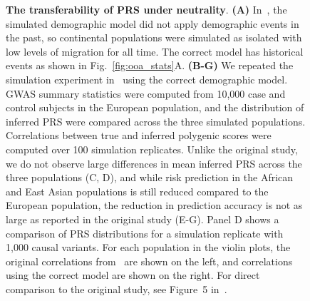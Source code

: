\documentclass{article}
\begin{document}
\begin{figure}[ht]
\begin{center}
\caption{\textbf{The transferability of PRS under neutrality}.
    \textbf{(A)} In~\citet{martin2017human}, the simulated demographic model did not apply demographic
    events in the past, so continental populations were simulated as isolated with low levels of migration
    for all time. The correct model has historical events as shown in Fig.~\ref{fig:ooa_stats}A.
    \textbf{(B-G)} We repeated the simulation experiment in~\citet{martin2017human} using the correct
    demographic model.
    GWAS summary statistics were computed from 10,000 case and control subjects in the European
    population, and the distribution of inferred PRS were compared across the three simulated populations.
    Correlations between true and inferred polygenic scores were computed over 100 simulation replicates.
    Unlike the original study, we do not observe large differences in mean inferred PRS across
    the three populations (C, D), and while risk prediction in the African and East Asian populations is
    still reduced compared to the European population, the reduction in prediction accuracy is not as
    large as reported in the original study (E-G).
    Panel D shows a comparison of PRS distributions for a simulation replicate with 1,000 causal variants.
    For each population in the violin plots, the original correlations from~\citet{martin2017human}
    are shown on the left, and correlations using the correct model are shown on the right.
    For direct comparison to the original study, see Figure~5 in~\citet{martin2017human}.
}
\label{fig:prs}
\end{center}
\end{figure}
\end{document}
